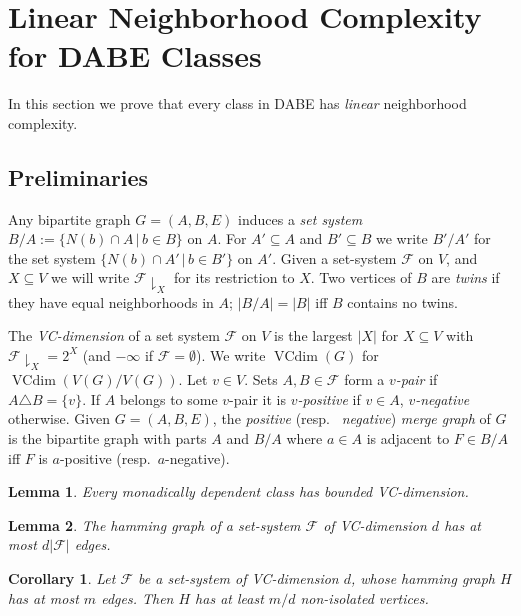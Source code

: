 \documentclass[11pt]{article}
\newtheorem{corollary}[theorem]{Corollary}
\newtheorem{lemma}{Lemma}
\theoremstyle{definition}
\newcommand{\inducedSS}[2]{#1/#2}%
\newcommand{\set}[1]{\{#1\}}
\newcommand{\setof}[2]{\set{#1 \,|\, #2 }}
\newcommand{\res}[1]{{\downharpoonright}_{#1}}
\renewcommand{\cal}{\mathcal}
\DeclareMathOperator{\VCdim}{VCdim}
\newcommand{\remph}[1]{{\color{red} \emph{#1}}}
\begin{document}
\section{Linear Neighborhood Complexity for DABE Classes}
\label{sec:nc-dabe}

In this section we prove that every class in DABE has \emph{linear} neighborhood complexity.

\subsection{Preliminaries}

Any bipartite graph $G=(A,B,E)$ induces a \remph{set system} $\inducedSS{B}{A} := \setof{N(b)\cap A}{b\in B}$ on $A$.
For $A'\subseteq A$ and $B'\subseteq B$ we write $\inducedSS{B'}{A'}$ for the set system $\setof{N(b)\cap A'}{b\in B'}$ on $A'$. Given a set-system $\cal F$ on $V$, and $X \subseteq V$ we will write \remph{$\cal F\res X$} for its restriction to $X$.
Two vertices of $B$ are \remph{twins} if they have equal neighborhoods in $A$; $|\inducedSS{B}{A}|=|B|$ iff $B$ contains no twins.

The \remph{VC-dimension} of a set system $\cal F$ on $V$ is the largest $|X|$ for $X\subseteq V$ with $\cal F\res X=2^X$ (and $-\infty$ if $\cal F=\emptyset$).
We write $\VCdim(G)$ for $\VCdim(\inducedSS{V(G)}{V(G)})$.
Let $v\in V$. Sets $A,B\in\cal F$ form a \remph{$v$-pair} if $A\triangle B=\set{v}$.
If $A$ belongs to some $v$-pair it is \remph{$v$-positive} if $v\in A$, \remph{$v$-negative} otherwise.
Given $G=(A,B,E)$, the \remph{positive} (resp.\ \remph{negative}) \remph{merge graph} of $G$ is the bipartite graph with parts $A$ and $\inducedSS{B}{A}$ where $a\in A$ is adjacent to $F\in \inducedSS{B}{A}$ iff $F$ is $a$-positive (resp.\ $a$-negative).


\begin{lemma}\label{lem:dabe-bounded-vc}
Every monadically dependent class has bounded VC-dimension.
\end{lemma}

\begin{lemma}\label{lem:VC-dim2deg}
The hamming graph of a set-system $\cal F$ of VC-dimension $d$ has at most $d |\cal F|$ edges.  
\end{lemma}

\begin{corollary}\label{cor:hamming}
Let $\cal F$ be a set-system of VC-dimension $d$, whose hamming graph $H$ has at most $m$ edges. Then $H$ has at least $m/d$ non-isolated vertices.
\end{corollary}
\end{document}
